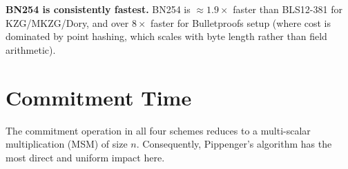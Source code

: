 \textbf{BN254 is consistently fastest.} BN254 is $\approx 1.9\times$
faster than BLS12-381 for KZG/MKZG/Dory, and over $8\times$ faster
for Bulletproofs setup (where cost is dominated by point hashing,
which scales with byte length rather than field arithmetic).

\section{Commitment Time}
\label{sec:commit-comparison}

The commitment operation in all four schemes reduces to a
multi-scalar multiplication (MSM) of size $n$. Consequently,
Pippenger's algorithm has the most direct and uniform impact here.


\begin{table}[H]
\centering
\caption{Commit time (ms) at representative sizes with Pippenger.}
\label{tab:commit-all}
%
\end{table}


